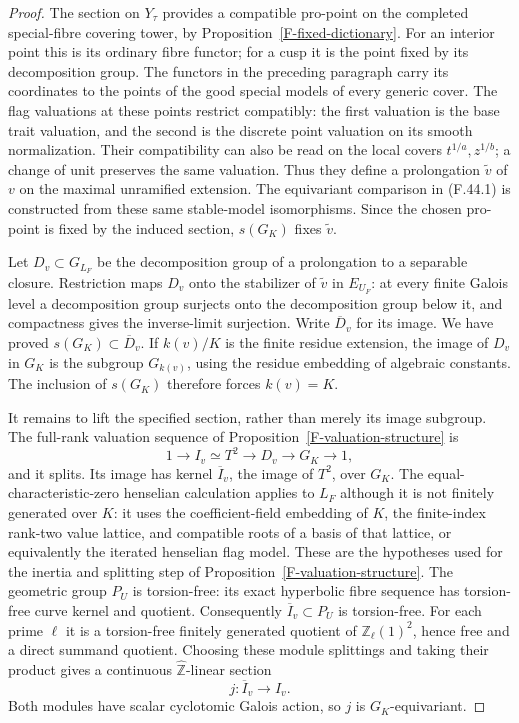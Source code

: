 \documentclass[11pt,oneside]{article}
\begin{document}
\begin{proof}
The section on $Y_\tau$ provides a compatible pro-point
on the completed special-fibre covering tower, by
Proposition~\ref{F-fixed-dictionary}. For an interior
point this is its ordinary fibre functor; for a cusp it
is the point fixed by its decomposition group. The
functors in the preceding paragraph carry its coordinates
to the points of the good special models of every
generic cover. The flag valuations at these points
restrict compatibly: the first valuation is the base
trait valuation, and the second is the discrete
point valuation on its smooth normalization. Their
compatibility can also be read on the local covers
$t^{1/a},z^{1/b}$; a change of unit preserves the
same valuation. Thus they define a prolongation
$\widetilde v$ of $v$ on the maximal unramified extension.
The equivariant comparison in (F.44.1) is constructed
from these same stable-model isomorphisms. Since the
chosen pro-point is fixed by the induced section,
$s(G_K)$ fixes $\widetilde v$.

Let $D_v\subset G_{L_F}$ be the decomposition group of
a prolongation to a separable closure. Restriction maps
$D_v$ onto the stabilizer of $\widetilde v$ in
$E_{U_F}$: at every finite Galois level a decomposition
group surjects onto the decomposition group below it,
and compactness gives the inverse-limit surjection.
Write $\overline D_v$ for its image. We have proved
$s(G_K)\subset\overline D_v$. If $k(v)/K$ is the
finite residue extension, the image of $D_v$ in $G_K$
is the subgroup $G_{k(v)}$, using the residue embedding
of algebraic constants. The inclusion of $s(G_K)$
therefore forces $k(v)=K$.

It remains to lift the specified section, rather than
merely its image subgroup. The full-rank valuation
sequence of Proposition~\ref{F-valuation-structure} is
\[
 1\longrightarrow I_v\simeq T^2\longrightarrow D_v
        \longrightarrow G_K\longrightarrow1,
 \tag{F.44.2}
\]
and it splits. Its image has kernel
$\overline I_v$, the image of $T^2$, over $G_K$.
The equal-characteristic-zero henselian calculation
applies to $L_F$ although it is not finitely generated
over $K$: it uses the coefficient-field embedding of
$K$, the finite-index rank-two value lattice, and
compatible roots of a basis of that lattice, or
equivalently the iterated henselian flag model.
These are the hypotheses used for the inertia and
splitting step of Proposition~\ref{F-valuation-structure}.
The geometric group $P_U$ is torsion-free: its exact
hyperbolic fibre sequence has torsion-free curve kernel
and quotient. Consequently $\overline I_v\subset P_U$
is torsion-free. For each prime $\ell$ it is a
torsion-free finitely generated quotient of
$\mathbb Z_\ell(1)^2$, hence free and a direct summand
quotient. Choosing these module splittings and taking
their product gives a continuous
$\widehat{\mathbb Z}$-linear section
\[
                       j:\overline I_v\longrightarrow I_v.
\]
Both modules have scalar cyclotomic Galois action, so
$j$ is $G_K$-equivariant.


\end{proof}
\end{document}
